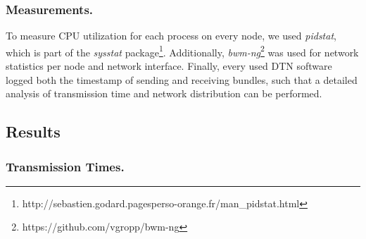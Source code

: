 
\subsubsection{Measurements.}
To measure CPU utilization for each process on every node, we used \textit{pidstat}, which is part of the \textit{sysstat} package\footnote{http://sebastien.godard.pagesperso-orange.fr/man\_pidstat.html}.
Additionally, \textit{bwm-ng}\footnote{https://github.com/vgropp/bwm-ng} was used for network statistics per node and network interface.
Finally, every used DTN software logged both the timestamp of sending and receiving bundles, such that a detailed analysis of transmission time and network distribution can be performed.


\subsection{Results}

\subsubsection{Transmission Times.}
\label{subsub:transmission_time}

